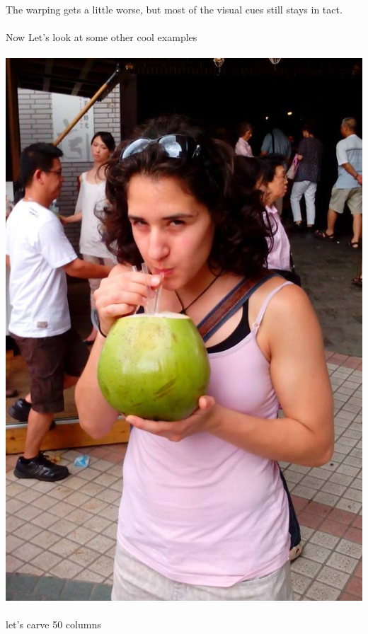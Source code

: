 \documentclass[english]{article}
\begin{document}
The warping gets a little worse, but most of the visual cues still stays in tact.\\\\
Now Let's look at some other cool examples\\\\
\includegraphics[scale=0.6]{carving/lola.jpg}\\\\
let's carve 50 columns\\\\
\end{document}
